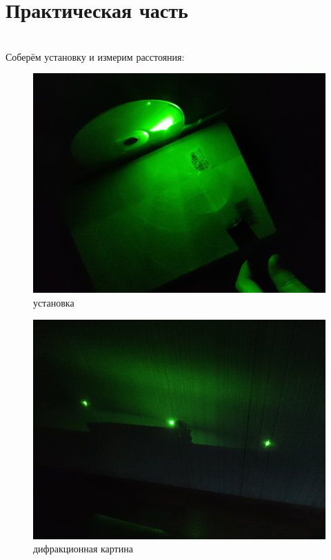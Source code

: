 \documentclass[a4paper]{article}
\begin{document}
\section{Практическая часть}\\
Соберём установку и измерим расстояния:\\
\begin{figure}[H]
    \centering
    \includegraphics[scale=0.1]{ust.jpg}
    \caption{установка}
\end{figure}
\begin{figure}[H]
    \centering
    \includegraphics[scale=0.1]{diffrac.jpg}
    \caption{дифракционная картина}
\end{figure}
\\
\end{document}
